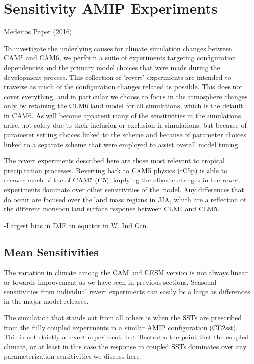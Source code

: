 \section{Sensitivity AMIP Experiments}
\label{sec:sensitivities}

Medeiros Paper (2016)

To investigate the underlying causes for climate simulation changes between CAM5 and CAM6, we perform a suite of experiments targeting configuration dependencies and the primary model choices that were made during the development process. This collection of 'revert' experiments are intended to traverse as much of the configuration changes related as possible. This does not cover everything, and in particular we choose to focus in the atmosphere changes only by retaining the CLM6 land model for all simulations, which is the default in CAM6. As will become apparent many of the sensitivities in the simulations arise, not solely due to their inclusion or exclusion in simulations, but because of parameter setting choices linked to the scheme and because of parameter choices linked to a separate scheme that were employed to assist overall model tuning.

The revert experiments described here are those most relevant to tropical precipitation processes. Reverting back to CAM5 physics (rC5p) is able to recover much of the of CAM5 (C5), implying the climate changes in the revert experiments dominate over other sensitivities of the model. Any differences that do occur are focused over the land mass regions in JJA, which are a reflection of the different monsoon land surface response between CLM4 and CLM5.

-Largest bias in DJF on equator in W. Ind Ocn.

\subsection{Mean Sensitivities}

The variation in climate among the CAM and CESM version is not always linear or towards improvement as we have seen in previous sections. Seasonal sensitivities from individual revert experiments can easily be a large as differences in the major model releases.


The simulation that stands out from all others is when the SSTs are prescribed from the fully coupled experiments in a similar AMIP configuration (CE2sst). This is not strictly a revert experiment, but illustrates the point that the coupled climate, or at least in this case the response to coupled SSTs dominates over any parameterization sensitivities we discuss here. 


